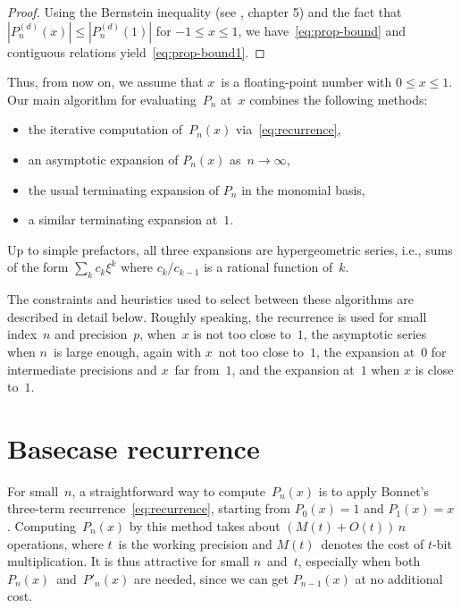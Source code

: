 \documentclass[11pt,a4paper]{article}
\begin{document}
\begin{proof}

Using the Bernstein inequality (see \cite{borwein2012polynomials}, chapter 5)
and the fact that $|P^{(d)}_n(x)| \le |P^{(d)}_n(1)|$ for $-1 \le x \le 1$,
we have~\eqref{eq:prop-bound}
and contiguous relations yield~\eqref{eq:prop-bound1}.
\end{proof}

Thus, from now on, we assume that $x$~is a floating-point number with
$0 \leq x \leq 1$.
Our main algorithm for evaluating~$P_n$ at~$x$ combines the following
methods:
\begin{itemize}
  \item the iterative computation of~$P_n(x)$
  via~\eqref{eq:recurrence},
  \item an asymptotic expansion of $P_n(x)$ as~$n \to \infty$,
  \item the usual terminating expansion of $P_n$ in the monomial
  basis,
  \item a similar terminating expansion at~$1$.
\end{itemize}
Up to simple prefactors, all three expansions are hypergeometric
series, i.e., sums of the form $\sum_k c_k \xi^k$ where $c_k/c_{k-1}$
is a rational function of~$k$.

The constraints and heuristics used to select between these algorithms
are described in detail below.
Roughly speaking,
the recurrence is used for small index~$n$ and precision~$p$, when~$x$
is not too close to~$1$,
the asymptotic series when $n$~is large enough, again with $x$~not too
close to~$1$,
the expansion at~$0$ for intermediate precisions and $x$~far from~$1$,
and the expansion at~$1$ when $x$ is close to~$1$.

\section{Basecase recurrence}

\label{sec:recurrence}

For small $n$, a straightforward way to compute~$P_n(x)$ is to apply
Bonnet's three-term recurrence \eqref{eq:recurrence},
starting from $P_0(x)=1$ and $P_1(x) = x$.
Computing~$P_n(x)$ by this method takes about $(M(t) + O(t))\, n$
operations, where $t$ is the working precision and $M(t)$ denotes the
cost of $t$-bit multiplication.
It is thus attractive for small $n$ and $t$, especially when both
$P_n(x)$ and $P'_n(x)$ are needed, since we can get $P_{n-1}(x)$ at no
additional cost.
\end{document}
